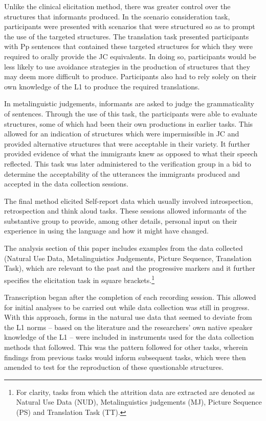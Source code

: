 \documentclass[output=paper,colorlinks,citecolor=brown]{langscibook}
\begin{document}
Unlike the clinical elicitation method, there was greater control over the structures that informants produced. In the scenario consideration task, participants were presented with scenarios that were structured so as to prompt the use of the targeted structures. The translation task presented participants with Pp sentences that contained these targeted structures for which they were required to orally provide the JC equivalents. In doing so, participants would be less likely to use avoidance strategies in the production of structures that they may deem more difficult to produce. Participants also had to rely solely on their own knowledge of the L1 to produce the required translations.

In metalinguistic judgements, informants are asked to judge the grammaticality of sentences. Through the use of this task, the participants were able to evaluate structures, some of which had been their own productions in earlier tasks. This allowed for an indication of structures which were impermissible in JC and provided alternative structures that were acceptable in their variety. It further provided evidence of what the immigrants knew as opposed to what their speech reflected. This task was later administered to the verification group in a bid to determine the acceptability of the utterances the immigrants produced and accepted in the data collection sessions.

The final method elicited Self-report data which usually involved introspection, retrospection and think aloud tasks. These sessions allowed informants of the substantive group to provide, among other details, personal input on their experience in using the language and how it might have changed.

\begin{sloppypar}
The analysis section of this paper includes examples from the data collected (Natural Use Data, Metalinguistics Judgements, Picture Sequence, Translation Task), which are relevant to the past and the progressive markers and it further specifies the elicitation task in square brackets.\footnote{For clarity, tasks from which the attrition data are extracted are denoted as Natural Use Data (NUD), Metalinguistics judgements (MJ), Picture Sequence (PS) and Translation Task (TT).}
\end{sloppypar}

Transcription began after the completion of each recording session. This allowed for initial analyses to be carried out while data collection was still in progress. With this approach, forms in the natural use data that seemed to deviate from the L1 norms -- based on the literature and the researchers' own native speaker knowledge of the L1 -- were included in instruments used for the data collection methods that followed. This was the pattern followed for other tasks, wherein findings from previous tasks would inform subsequent tasks, which were then amended to test for the reproduction of these questionable structures.
\end{document}
